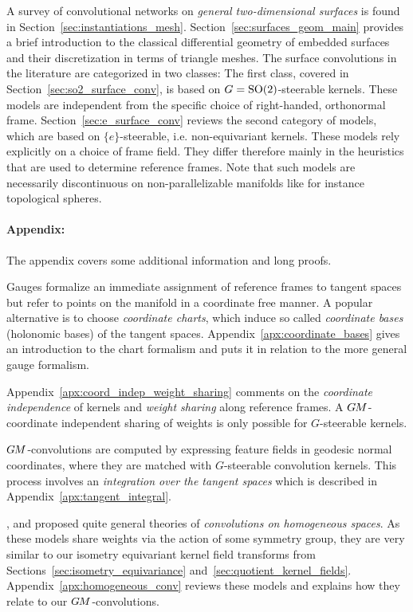 A survey of convolutional networks on \emph{general two-dimensional surfaces} is found in Section~\ref{sec:instantiations_mesh}.
Section~\ref{sec:surfaces_geom_main} provides a brief introduction to the classical differential geometry of embedded surfaces and their discretization in terms of triangle meshes.
The surface convolutions in the literature are categorized in two classes:
The first class, covered in Section~\ref{sec:so2_surface_conv}, is based on $G=\operatorname{SO}(2)$-steerable kernels.
These models are independent from the specific choice of right-handed, orthonormal frame.
Section~\ref{sec:e_surface_conv} reviews the second category of models, which are based on $\{e\}$-steerable, i.e. non-equivariant kernels.
These models rely explicitly on a choice of frame field.
They differ therefore mainly in the heuristics that are used to determine reference frames.
Note that such models are necessarily discontinuous on non-parallelizable manifolds like for instance topological spheres.




\paragraph{Appendix:}

The appendix covers some additional information and long proofs.

Gauges formalize an immediate assignment of reference frames to tangent spaces but refer to points on the manifold in a coordinate free manner.
A popular alternative is to choose \emph{coordinate charts}, which induce so called \emph{coordinate bases} (holonomic bases) of the tangent spaces.
Appendix~\ref{apx:coordinate_bases} gives an introduction to the chart formalism and puts it in relation to the more general gauge formalism.

Appendix~\ref{apx:coord_indep_weight_sharing} comments on the \emph{coordinate independence} of kernels and \emph{weight sharing} along reference frames.
A $G\mkern-1.4muM$-coordinate independent sharing of weights is only possible for $G$-steerable kernels.

$G\mkern-1.4muM$-convolutions are computed by expressing feature fields in geodesic normal coordinates, where they are matched with $G$-steerable convolution kernels.
This process involves an \emph{integration over the tangent spaces} which is described in Appendix~\ref{apx:tangent_integral}.

\citet{Kondor2018-GENERAL}, \citet{Cohen2019-generaltheory} and \citet{bekkers2020bspline} proposed quite general theories of \emph{convolutions on homogeneous spaces}.
As these models share weights via the action of some symmetry group, they are very similar to our isometry equivariant kernel field transforms from Sections~\ref{sec:isometry_equivariance} and~\ref{sec:quotient_kernel_fields}.
Appendix~\ref{apx:homogeneous_conv} reviews these models and explains how they relate to our $G\mkern-1.4muM$-convolutions.

